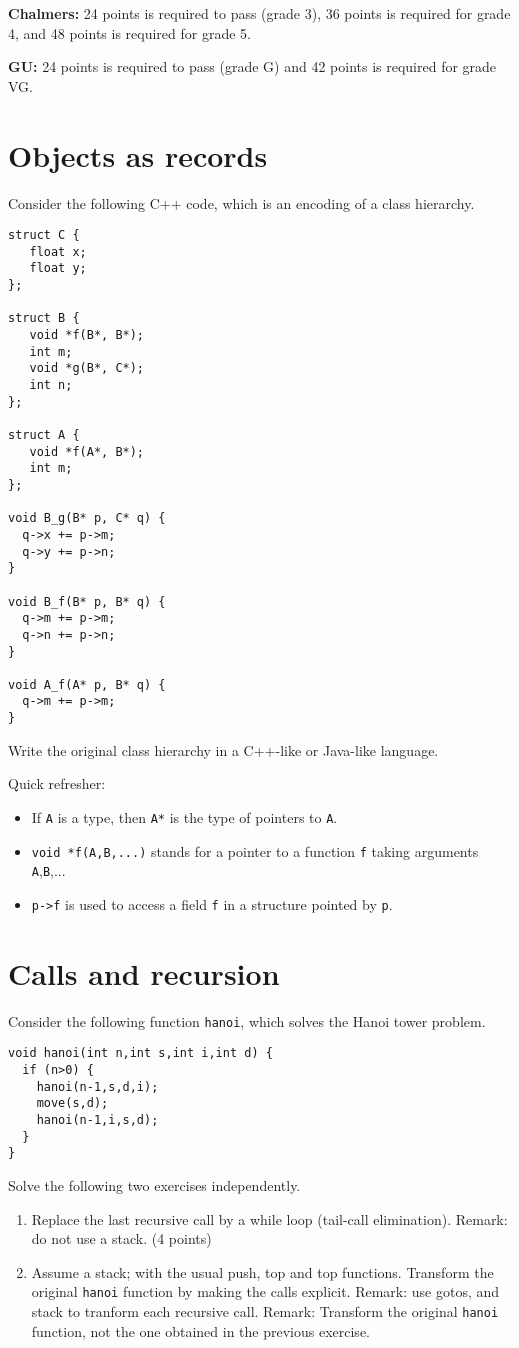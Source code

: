 \documentclass{article}
\begin{document}
\textbf{Chalmers:}
24 points is required to pass (grade 3), 36 points is required for
grade 4, and 48 points is required for grade 5.

\textbf{GU:}
24 points is required to pass (grade G) and 42 points is
required for grade VG.

\section{Objects as records}

Consider the following C++ code, which is an encoding of a class
hierarchy.
\begin{verbatim}
struct C {
   float x;
   float y;
};

struct B {
   void *f(B*, B*);
   int m;
   void *g(B*, C*);
   int n;
};

struct A {
   void *f(A*, B*);
   int m;
};

void B_g(B* p, C* q) {
  q->x += p->m;
  q->y += p->n;
}

void B_f(B* p, B* q) {
  q->m += p->m;
  q->n += p->n;
}

void A_f(A* p, B* q) {
  q->m += p->m;
}
\end{verbatim}

Write the original class hierarchy in a C++-like or Java-like language.

Quick refresher:
\begin{itemize}
\item If \texttt{A} is a type, then \texttt{A*} is the type of
  pointers to \texttt{A}.
\item \texttt{void *f(A,B,...)} stands for a pointer to a function
  \texttt{f} taking arguments \texttt{A},\texttt{B},...
\item \texttt{p->f} is used to access a field \texttt{f} in a
  structure pointed by \texttt{p}.
\end{itemize}
\section{Calls and recursion}

Consider the following function \texttt{hanoi},
which solves the Hanoi tower problem.

\begin{verbatim}
void hanoi(int n,int s,int i,int d) {
  if (n>0) {
    hanoi(n-1,s,d,i);
    move(s,d);
    hanoi(n-1,i,s,d);
  }
}
\end{verbatim}

Solve the following two exercises independently.
\begin{enumerate}
\item Replace the last recursive call by a while loop (tail-call
  elimination). Remark: do not use a stack. (4 points)
\item Assume a stack; with the usual push, top and top
  functions. Transform the original \texttt{hanoi} function by making the calls
  explicit. Remark: use gotos, and stack to tranform each recursive
  call. Remark: Transform the original \texttt{hanoi} function, not the one
  obtained in the previous exercise.
\end{enumerate}
\end{document}
